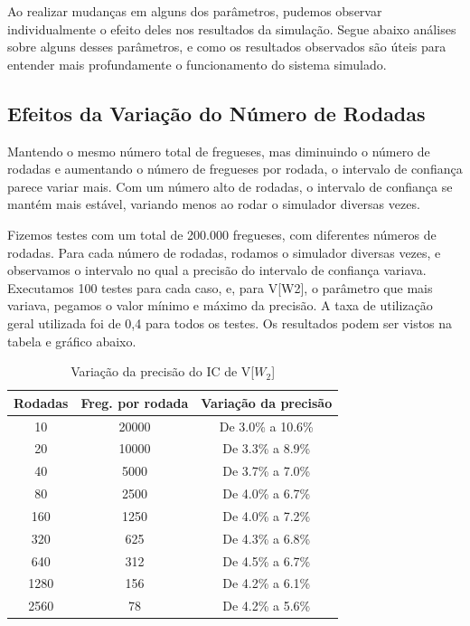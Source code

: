 \documentclass[a4paper,12pt]{report}
\begin{document}
Ao realizar mudanças em alguns dos parâmetros, pudemos observar individualmente o efeito deles nos resultados da simulação. Segue abaixo análises sobre alguns desses parâmetros, e como os resultados observados são úteis para entender mais profundamente o funcionamento do sistema simulado.

\subsection{Efeitos da Variação do Número de Rodadas}

Mantendo o mesmo número total de fregueses, mas diminuindo o número de rodadas e aumentando o número de fregueses por rodada, o intervalo de confiança parece variar mais. Com um número alto de rodadas, o intervalo de confiança se mantém mais estável, variando menos ao rodar o simulador diversas vezes.

Fizemos testes com um total de 200.000 fregueses, com diferentes números de rodadas. Para cada número de rodadas, rodamos o simulador diversas vezes, e observamos o intervalo no qual a precisão do intervalo de confiança variava. Executamos 100 testes para cada caso, e, para V[W2], o parâmetro que mais variava, pegamos o valor mínimo e máximo da precisão. A taxa de utilização geral utilizada foi de 0,4 para todos os testes. Os resultados podem ser vistos na tabela e gráfico abaixo.


\begin{table}[H]
\begin{center}
\begin{tabular}{ c c c }
  \hline
  \textbf{Rodadas} & \textbf{Freg. por rodada} & \textbf{Variação da precisão} \\
  \hline
  10  & 20000 & De 3.0\% a 10.6\% \\
  20  & 10000 & De 3.3\% a 8.9\% \\
  40  & 5000  & De 3.7\% a 7.0\% \\
  80  & 2500  & De 4.0\% a 6.7\% \\
  160 & 1250  & De 4.0\% a 7.2\% \\
  320 & 625   & De 4.3\% a 6.8\% \\
  640 & 312   & De 4.5\% a 6.7\% \\
  1280 & 156  & De 4.2\% a 6.1\% \\
  2560 & 78   & De 4.2\% a 5.6\% \\
  \hline
\end{tabular}
\caption{Variação da precisão do IC de V[$W_2$]}
\end{center}
\end{table}
\end{document}
